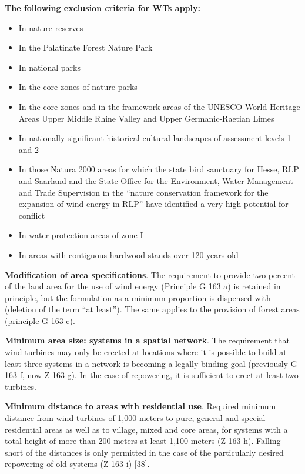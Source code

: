 \documentclass[a4paper,11pt]{article}
\providecommand{\tightlist}{%
  \setlength{\itemsep}{0pt}\setlength{\parskip}{0pt}}
\begin{document}
\textbf{The following exclusion criteria for WTs apply:}
\begin{itemize}
\tightlist
\item
  In nature reserves
\item
  In the Palatinate Forest Nature Park
\item
  In national parks
\item
  In the core zones of nature parks
\item
  In the core zones and in the framework areas of the UNESCO World Heritage Areas Upper Middle Rhine Valley and Upper Germanic-Raetian Limes
\item
  In nationally significant historical cultural landscapes of assessment levels 1 and 2
\item
  In those Natura 2000 areas for which the state bird sanctuary for Hesse, RLP and Saarland and the State Office for the Environment, Water Management and Trade Supervision in the ``nature conservation framework for the expansion of wind energy in RLP'' have identified a very high potential for conflict
\item
  In water protection areas of zone I
\item
  In areas with contiguous hardwood stands over 120 years old
\end{itemize}
\textbf{Modification of area specifications}. The requirement to provide two percent of the land area for the use of wind energy (Principle G 163 a) is retained in principle, but the formulation as a minimum proportion is dispensed with (deletion of the term ``at least''). The same applies to the provision of forest areas (principle G 163 c).

\textbf{Minimum area size: systems in a spatial network}. The requirement that wind turbines may only be erected at locations where it is possible to build at least three systems in a network is becoming a legally binding goal (previously G 163 f, now Z 163 g). In the case of repowering, it is sufficient to erect at least two turbines.

\textbf{Minimum distance to areas with residential use}. Required minimum distance from wind turbines of 1,000 meters to pure, general and special residential areas as well as to village, mixed and core areas, for systems with a total height of more than 200 meters at least 1,100 meters (Z 163 h). Falling short of the distances is only permitted in the case of the particularly desired repowering of old systems (Z 163 i) {[}\protect\hyperlink{ref-MinisteriumdesInnernundfurSport.2017}{38}{]}.
\end{document}
